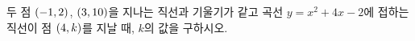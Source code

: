 두 점 $(-1{,}\mkern3mu\mathopen{}2)$, $(3{,}\mkern3mu\mathopen{}10)$을 지나는 직선과 기울기가 같고 곡선 $y=x^2+4x-2$에 접하는 직선이 점 $(4{,}\mkern3mu\mathopen{}k)$를 지날 때, $k$의 값을 구하시오.
